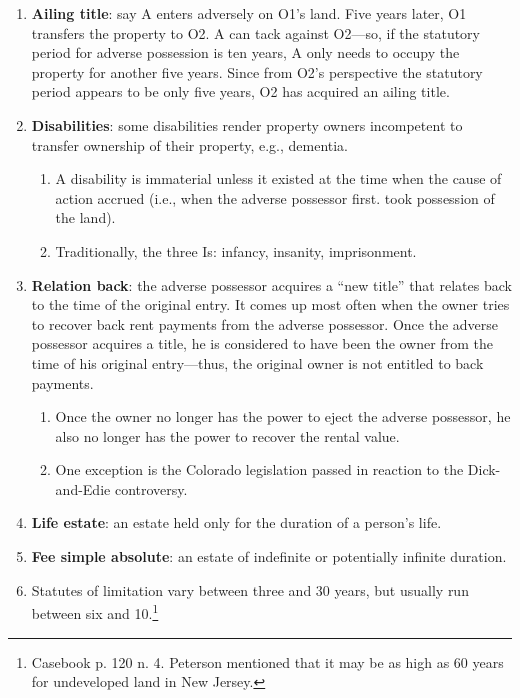 \begin{enumerate}
\begin{enumerate}
    \end{enumerate}
    \item \textbf{Ailing title}: say A enters adversely on O1's land. Five 
    years later, O1 transfers the property to O2. A can tack against O2---so, if 
    the statutory period for adverse possession is ten years, A only needs to 
    occupy the property for another five years. Since from O2's perspective the 
    statutory period appears to be only five years, O2 has acquired an ailing 
    title.
    \item \textbf{Disabilities}: some disabilities render property owners 
    incompetent to transfer ownership of their property, e.g., dementia.
    \begin{enumerate}
        \item A disability is immaterial unless it existed at the time when 
        the cause of action accrued (i.e., when the adverse possessor first.
        took possession of the land).
        \item Traditionally, the three Is: infancy, insanity, imprisonment.
    \end{enumerate}
    \item \textbf{Relation back}: the adverse possessor acquires a ``new title'' 
    that relates back to the time of the original entry. It comes up most often 
    when the owner tries to recover back rent payments from the adverse 
    possessor. Once the adverse possessor acquires a title, he is considered to 
    have been the owner from the time of his original entry---thus, the original 
    owner is not entitled to back payments.
    \begin{enumerate}
        \item Once the owner no longer has the power to eject the adverse 
        possessor, he also no longer has the power to recover the rental value.
        \item One exception is the Colorado legislation passed in reaction to 
        the Dick-and-Edie controversy.
    \end{enumerate}
    \item \textbf{Life estate}: an estate held only for the duration of a 
    person's life.
    \item \textbf{Fee simple absolute}: an estate of indefinite or potentially 
    infinite duration.
    \item Statutes of limitation vary between three and 30 years, but usually 
    run between six and 10.\footnote{Casebook p. 120 n. 4. Peterson mentioned 
    that it may be as high as 60 years for undeveloped land in New Jersey.}

\end{enumerate}
